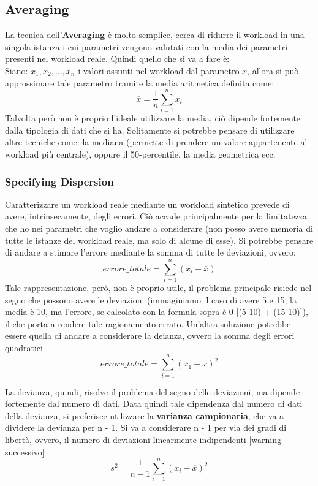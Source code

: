 \subsection{Averaging}
La tecnica dell'\textbf{Averaging} è molto semplice, cerca di ridurre il workload in una singola istanza i cui parametri vengono valutati con la media dei parametri presenti nel workload reale. Quindi quello che si va a fare è:
\\
Siano: \({x_1,x_2, \dots, x_n}\) i valori assunti nel workload dal parametro \(x\), allora si può approssimare tale parametro tramite la media aritmetica definita come:
\[
\overline{x} = \frac{1}{n}\sum_{i=1}^{n}x_i
\]
Talvolta però non è proprio l'ideale utilizzare la media, ciò dipende fortemente dalla tipologia di dati che si ha. Solitamente si potrebbe pensare di utilizzare altre tecniche come: la mediana (permette di prendere un valore appartenente al workload più centrale), oppure il 50-percentile, la media geometrica ecc.

\subsubsection{Specifying Dispersion}
Caratterizzare un workload reale mediante un workload sintetico prevede di avere, intrinsecamente, degli errori. Ciò accade principalmente per la limitatezza che ho nei parametri che voglio andare a considerare (non posso avere memoria di tutte le istanze del workload reale, ma solo di alcune di esse).
Si potrebbe pensare di andare a stimare l'errore mediante la somma di tutte le deviazioni, ovvero:
\[
errore\_totale = \sum_{i=1}^{n}(x_i-\overline{x})
\]
Tale rappresentazione, però, non è proprio utile, il problema principale risiede nel segno che possono avere le deviazioni (immaginiamo il caso di avere 5 e 15, la media è 10, ma l'errore, se calcolato con la formula sopra è 0 [(5-10) + (15-10)]), il che porta a rendere tale ragionamento errato.
Un'altra soluzione potrebbe essere quella di andare a considerare la deianza, ovvero la somma degli errori quadratici
\[
errore\_totale = \sum_{i=1}^{n}(x_1 - \overline{x})^2
\]

La devianza, quindi, risolve il problema del segno delle deviazioni, ma dipende fortemente dal numero di dati.
Data quindi tale dipendenza dal numero di dati della devianza, si preferisce utilizzare la \textbf{varianza campionaria}, che va a dividere la devianza per n - 1. Si va a considerare n - 1 per  via dei gradi di libertà, ovvero, il numero di deviazioni linearmente indipendenti [warning successivo]
\[
s^2 = \frac{1}{n-1}\sum_{i=1}^{n}(x_i-\overline{x})^2
\]


